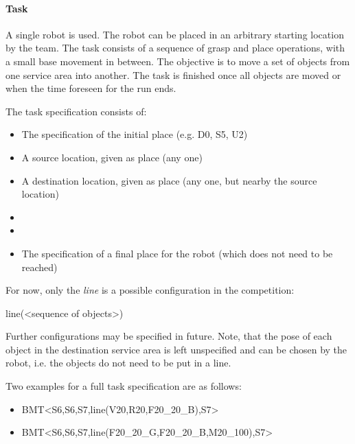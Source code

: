 \paragraph{Task}
A single robot is used. The robot can be placed in an arbitrary starting location by the team. The task consists of a sequence of grasp and place operations, with a small base movement in between. The objective is to move a set of objects from one service area into another. The task is finished once all objects are moved or when the time foreseen for the run ends.
\par
The task specification consists of:
\begin{itemize}
	\item The specification of the initial place (e.g. D0, S5, U2)
	\item A source location, given as place (any one)
	\item A destination location, given as place (any one, but nearby the source location)
	\item {}
	\item {}
	\item The specification of a final place for the robot (which does not need to be reached)
\end{itemize}

For now, only the \emph{line} is a possible configuration in the competition:
\begin{center}
	line(\textless sequence of objects\textgreater )
\end{center}
\par
Further configurations may be specified in future. Note, that the pose  of each object in the destination service area is left unspecified and can be chosen by the robot, i.e. the objects do not need to be put in a line.

Two examples for a full task specification are as follows:
\begin{itemize}
	\item BMT\textless S6,S6,S7,line(V20,R20,F20\_20\_B),S7\textgreater
	\item BMT\textless S6,S6,S7,line(F20\_20\_G,F20\_20\_B,M20\_100),S7\textgreater
\end{itemize}

